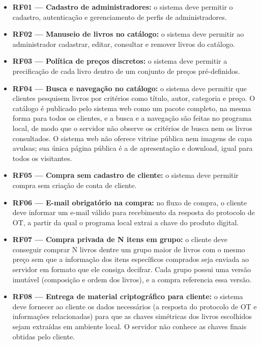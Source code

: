 \documentclass[12pt, oneside, a4paper, english, brazil]{abntex2}
\begin{document}
\begin{itemize}
\item \textbf{RF01 --- Cadastro de administradores:} o sistema deve permitir o
cadastro, autenticação e gerenciamento de perfis de administradores.

\item \textbf{RF02 --- Manuseio de livros no catálogo:} o sistema deve
permitir ao administrador cadastrar, editar, consultar e remover livros do
catálogo.

\item \textbf{RF03 --- Política de preços discretos:} o sistema deve permitir
a precificação de cada livro dentro de um conjunto de preços pré-definidos.

\item \textbf{RF04 --- Busca e navegação no catálogo:} o sistema deve permitir
que clientes pesquisem livros por critérios como título, autor, categoria e
preço. O catálogo é publicado pelo sistema web como um pacote completo, na
mesma forma para todos os clientes, e a busca e a navegação são feitas no
programa local, de modo que o servidor não observe os critérios de busca nem
os livros consultados. O sistema web não oferece vitrine pública nem imagens
de capa avulsas; sua única página pública é a de apresentação e download, igual
para todos os visitantes.

\item \textbf{RF05 --- Compra sem cadastro de cliente:} o sistema deve
permitir compra sem criação de conta de cliente.

\item \textbf{RF06 --- E-mail obrigatório na compra:} no fluxo de compra, o
cliente deve informar um e-mail válido para recebimento da resposta do
protocolo de OT, a partir da qual o programa local extrai a chave do produto
digital.

\item \textbf{RF07 --- Compra privada de N itens em grupo:} o cliente deve
conseguir comprar N livros dentre um grupo maior de livros com o mesmo preço
sem que a informação dos itens específicos comprados seja enviada ao servidor
em formato que ele consiga decifrar. Cada grupo possui uma versão imutável
(composição e ordem dos livros), e a compra referencia essa versão.

\item \textbf{RF08 --- Entrega de material criptográfico para cliente:} o
sistema deve fornecer ao cliente os dados necessários (a resposta do
protocolo de OT e informações relacionadas) para que as chaves simétricas dos
livros escolhidos sejam extraídas em ambiente local. O servidor não conhece as
chaves finais obtidas pelo cliente.


\end{itemize}
\end{document}
